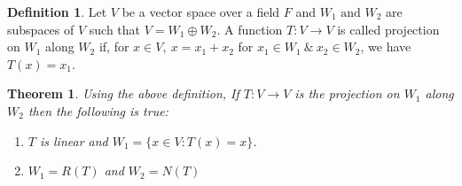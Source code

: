 \documentclass[12pt, a4paper]{article}
\newtheorem{theorem}{Theorem}[section]
\theoremstyle{definition}
\newtheorem{definition}{Definition}[section]
\theoremstyle{remark}
\begin{document}
\begin{definition}
    Let $V$ be a vector space over a field $F$ and $W_1 \text{ and } W_2$ are subspaces of $V$ such that $V = W_1 \oplus W_2 $. A function $T:V\to V$ is called projection on $W_1$ along $W_2$ if, for $x \in V, \ x = x_1+x_2$ for $x_1 \in W_1 \ \& \ x_2 \in W_2$, we have $T(x)=x_1$.
\end{definition}

\begin{theorem}
    Using the above definition, If $T:V\to V$ is the projection on $W_1$ along $W_2$ then the following is true:
    \begin{enumerate}
        \item $T$ is linear and $W_1 = \{x \in V : T(x)=x\}$.
        \item $W_1 = R(T)$ and $W_2=N(T)$
    \end{enumerate}
\end{theorem}
\end{document}
